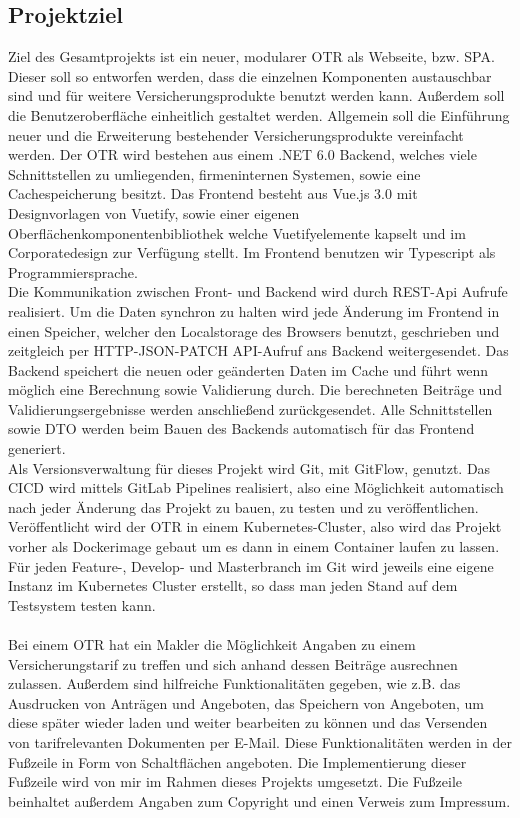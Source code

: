 \subsection{Projektziel}
\label{projektziel}
Ziel des Gesamtprojekts ist ein neuer, modularer \ac{OTR} als Webseite, bzw. \ac{SPA}. Dieser soll so entworfen werden, dass die einzelnen Komponenten austauschbar sind und für weitere Versicherungsprodukte benutzt werden kann. Außerdem soll die Benutzeroberfläche einheitlich gestaltet werden. Allgemein soll die Einführung neuer und die Erweiterung bestehender Versicherungsprodukte vereinfacht werden. Der \ac{OTR} wird bestehen aus einem .NET 6.0 Backend, welches viele Schnittstellen zu umliegenden, firmeninternen Systemen, sowie eine Cachespeicherung besitzt. Das Frontend besteht aus Vue.js 3.0 mit Designvorlagen von Vuetify, sowie einer eigenen Oberflächenkomponentenbibliothek welche Vuetifyelemente kapselt und im Corporatedesign zur Verfügung stellt. Im Frontend benutzen wir Typescript als Programmiersprache.\\
Die Kommunikation zwischen Front- und Backend wird durch REST-Api Aufrufe realisiert. Um die Daten synchron zu halten wird jede Änderung im Frontend in einen Speicher, welcher den Localstorage des Browsers benutzt, geschrieben und zeitgleich per HTTP-JSON-PATCH API-Aufruf ans Backend weitergesendet. Das Backend speichert die neuen oder geänderten Daten im Cache und führt wenn möglich eine Berechnung sowie Validierung durch. Die berechneten Beiträge und Validierungsergebnisse werden anschließend zurückgesendet. Alle Schnittstellen sowie \ac{DTO} werden beim Bauen des Backends automatisch für das Frontend generiert.\\
Als Versionsverwaltung für dieses Projekt wird Git, mit GitFlow, genutzt. Das \ac{CICD} wird mittels GitLab Pipelines realisiert, also eine Möglichkeit automatisch nach jeder Änderung das Projekt zu bauen, zu testen und zu veröffentlichen. Veröffentlicht wird der \ac{OTR} in einem Kubernetes-Cluster, also wird das Projekt vorher als Dockerimage gebaut um es dann in einem Container laufen zu lassen. Für jeden Feature-, Develop- und Masterbranch im Git wird jeweils eine eigene Instanz im Kubernetes Cluster erstellt, so dass man jeden Stand auf dem Testsystem testen kann.
\\\\
Bei einem \ac{OTR} hat ein Makler die Möglichkeit Angaben zu einem Versicherungstarif zu treffen und sich anhand dessen Beiträge ausrechnen zulassen. Außerdem sind hilfreiche Funktionalitäten gegeben, wie z.B. das Ausdrucken von Anträgen und Angeboten, das Speichern von Angeboten, um diese später wieder laden und weiter bearbeiten zu können und das Versenden von tarifrelevanten Dokumenten per E-Mail. Diese Funktionalitäten werden in der Fußzeile in Form von Schaltflächen angeboten. Die Implementierung dieser Fußzeile wird von mir im Rahmen dieses Projekts umgesetzt. Die Fußzeile beinhaltet außerdem Angaben zum Copyright und einen Verweis zum Impressum.
\\\\

